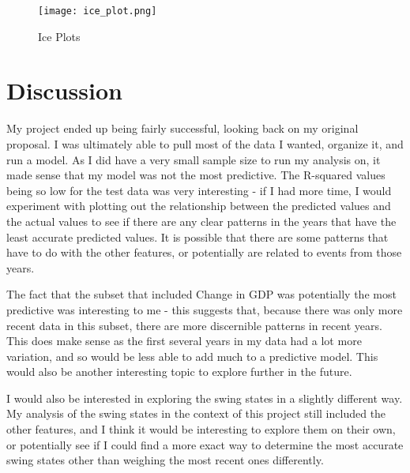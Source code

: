 \documentclass[12pt]{article}
\begin{document}
\begin{figure}[H]
    \centering
    \texttt{[image: ice\_plot.png]}
    \caption{Ice Plots}
\end{figure}

\section*{Discussion}

My project ended up being fairly successful, looking back on my original proposal. I was ultimately able to pull most of the data I wanted, organize it, and run a model. As I did have a very small sample size to run my analysis on, it made sense that my model was not the most predictive. The R-squared values being so low for the test data was very interesting - if I had more time, I would experiment with plotting out the relationship between the predicted values and the actual values to see if there are any clear patterns in the years that have the least accurate predicted values. It is possible that there are some patterns that have to do with the other features, or potentially are related to events from those years. 

\vspace{3.00mm}

The fact that the subset that included Change in GDP was potentially the most predictive was interesting to me - this suggests that, because there was only more recent data in this subset, there are more discernible patterns in recent years. This does make sense as the first several years in my data had a lot more variation, and so would be less able to add much to a predictive model. This would also be another interesting topic to explore further in the future.

\vspace{3.00mm}

I would also be interested in exploring the swing states in a slightly different way. My analysis of the swing states in the context of this project still included the other features, and I think it would be interesting to explore them on their own, or potentially see if I could find a more exact way to determine the most accurate swing states other than weighing the most recent ones differently.


\theendnotes
\end{document}
